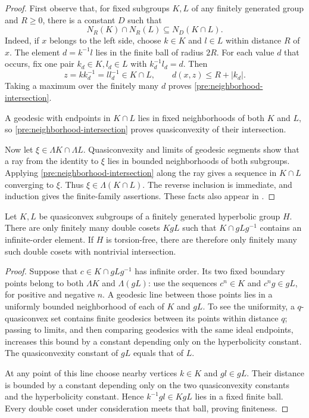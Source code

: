 \begin{proof}
First observe that, for fixed subgroups \(K,L\) of any finitely generated
group and \(R\geq 0\), there is a constant \(D\) such that
\begin{equation}
  N_R(K)\cap N_R(L)\subseteq N_D(K\cap L).
  \label{pre:neighborhood-intersection}
\end{equation}
Indeed, if \(x\) belongs to the left side, choose \(k\in K\) and \(l\in L\)
within distance \(R\) of \(x\). The element \(d=k^{-1}l\) lies in the finite
ball of radius \(2R\). For each value \(d\) that occurs, fix one pair
\(k_d\in K,l_d\in L\) with \(k_d^{-1}l_d=d\). Then
\[
  z=kk_d^{-1}=ll_d^{-1}\in K\cap L,
  \qquad d(x,z)\leq R+|k_d|.
\]
Taking a maximum over the finitely many \(d\) proves
\eqref{pre:neighborhood-intersection}.

A geodesic with endpoints in \(K\cap L\) lies in fixed neighborhoods of
both \(K\) and \(L\), so \eqref{pre:neighborhood-intersection} proves
quasiconvexity of their intersection.

Now let \(\xi\in\Lambda K\cap\Lambda L\). Quasiconvexity and limits of
geodesic segments show that a ray from the identity to \(\xi\) lies in
bounded neighborhoods of both subgroups. Applying
\eqref{pre:neighborhood-intersection} along the ray gives a sequence in
\(K\cap L\) converging to \(\xi\). Thus
\(\xi\in\Lambda(K\cap L)\). The reverse inclusion is immediate, and
induction gives the finite-family assertions.
These facts also appear in
\cite[Lemmas~2.6 and~2.7]{GitikMitraRipsSageev1998}.
\end{proof}

\begin{lemma}
\label{pre:double-coset-finiteness}
Let \(K,L\) be quasiconvex subgroups of a finitely generated hyperbolic
group \(H\). There are only finitely many double cosets \(KgL\) such that
\(K\cap gLg^{-1}\) contains an infinite-order element. If \(H\) is
torsion-free, there are therefore only finitely many such double cosets
with nontrivial intersection.
\end{lemma}

\begin{proof}
Suppose that \(c\in K\cap gLg^{-1}\) has infinite order. Its two fixed
boundary points belong to both \(\Lambda K\) and \(\Lambda(gL)\): use the
sequences \(c^n\in K\) and \(c^ng\in gL\), for positive and negative \(n\).
A geodesic line between those points lies in a uniformly bounded
neighborhood of each of \(K\) and \(gL\). To see the uniformity, a
\(q\)-quasiconvex set contains finite geodesics between its points within
distance \(q\); passing to limits, and then comparing geodesics with the
same ideal endpoints, increases this bound by a constant depending only
on the hyperbolicity constant. The quasiconvexity constant of \(gL\)
equals that of \(L\).

At any point of this line choose nearby vertices \(k\in K\) and
\(gl\in gL\). Their distance is bounded by a constant depending only on
the two quasiconvexity constants and the hyperbolicity constant. Hence
\(k^{-1}gl\in KgL\) lies in a fixed finite ball. Every double coset under
consideration meets that ball, proving finiteness.
\end{proof}

